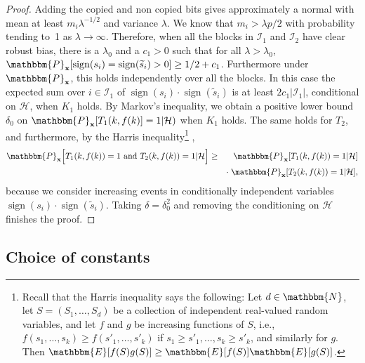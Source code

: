 \documentclass[final,12pt]{colt2018} %
\newcommand{\E}{\mathbbm{E}}
\newcommand{\N}{\mathbbm{N}}
\renewcommand{\P}{\mathbbm{P}}
\newcommand{\1}{\mathbf{1}}
\def\cI{\mathcal{I}}
\def\cH{\mathcal{H}}
\newcommand{\op}{\operatorname}
\newcommand{\wt}{\widetilde}
\def\x{{\bf x}}
\def\sign{\op{sign}}
\begin{document}
\begin{proof}
	Adding the copied and non copied bits gives approximately a normal with
	mean at least $m_i \lambda^{-1/2}$ and variance $\lambda$.  We know that
	$m_i > \lambda p/2$ with probability tending to~1 as $\lambda \to \infty$.
	Therefore, when all the blocks in
	$\cI_1$ and $\cI_2$ have clear robust bias, there is a $\lambda_0$ and a $c_1 > 0$ such that for all
	$\lambda > \lambda_0$, $\P_\x [\sign (s_i) = \sign (\wt s_i) > 0]
	\geq 1/2 + c_1$.  Furthermore under $\P_\x$, this holds independently
	over all the blocks.  In this case the expected sum over $i \in \cI_1$ of
	$\sign (s_i) \cdot \sign (\wt s_i)$ is at least $2 c_1 |\cI_1|$,
	conditional on $\cH$, when $K_1$ holds.  By Markov's inequality, we obtain
	a positive lower bound $\delta_0$ on $\P_\x [T_1 (k , f(k)] = 1 | \cH)$ when
	$K_1$ holds.  The same holds for $T_2$, and furthermore, by the Harris inequality\footnote{Recall that the Harris inequality says the following: Let $d\in\N$, let $S=(S_1,\dots,S_d)$ be a collection of independent real-valued random variables, and let $f$ and $g$ be increasing functions of $S$, i.e., $f(s_1,\dots,s_k)\geq f(s'_1,\dots,s'_k)$ if $s_1\geq s'_1,\dots,s_k\geq s'_k$, and similarly for $g$. Then $\E[f(S)g(S)]\geq \E[f(S)]\E[g(S)]$.} \cite{harris60,gg99},
	\begin{eqnarray*}
		\P_\x \Big [ T_1(k,f(k)) = 1 \mbox{ and } T_2 (k,f(k)) = 1 | \cH \Big ]
		& \geq & \P_\x [T_1(k,f(k)) = 1 | \cH] \\
		&& \cdot \; \P_\x [T_2(k,f(k)) = 1 | \cH],
	\end{eqnarray*}
	because we consider increasing events in conditionally independent variables $\sign (s_i) \cdot \sign (\wt s_i)$.  Taking $\delta =
	\delta_0^2$ and removing the conditioning on $\cH$ finishes the proof.
\end{proof}

\subsection{Choice of constants} \label{ss:choice}
\end{document}
